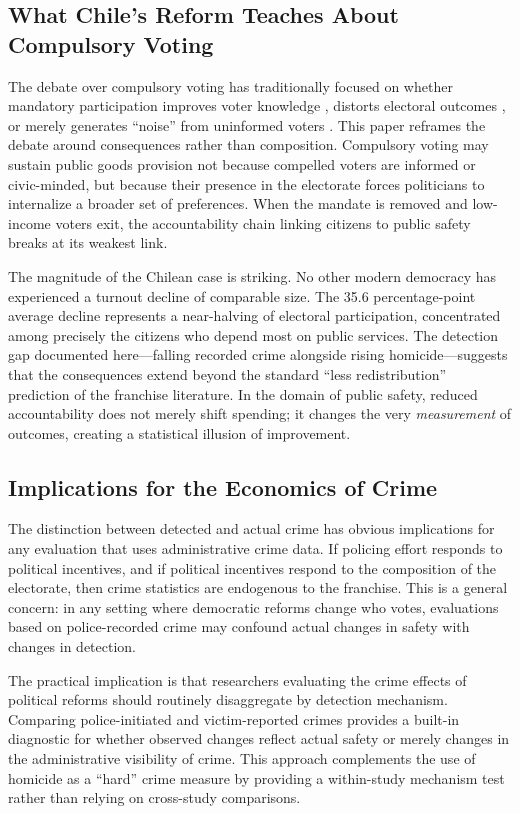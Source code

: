 \documentclass[12pt]{article}
\begin{document}
\subsection{What Chile's Reform Teaches About Compulsory Voting}

The debate over compulsory voting has traditionally focused on whether mandatory participation improves voter knowledge \citep{Bechtel2016}, distorts electoral outcomes \citep{Fowler2013}, or merely generates ``noise'' from uninformed voters \citep{Funk2010}. This paper reframes the debate around consequences rather than composition. Compulsory voting may sustain public goods provision not because compelled voters are informed or civic-minded, but because their presence in the electorate forces politicians to internalize a broader set of preferences. When the mandate is removed and low-income voters exit, the accountability chain linking citizens to public safety breaks at its weakest link.

The magnitude of the Chilean case is striking. No other modern democracy has experienced a turnout decline of comparable size. The 35.6 percentage-point average decline represents a near-halving of electoral participation, concentrated among precisely the citizens who depend most on public services. The detection gap documented here---falling recorded crime alongside rising homicide---suggests that the consequences extend beyond the standard ``less redistribution'' prediction of the franchise literature. In the domain of public safety, reduced accountability does not merely shift spending; it changes the very \textit{measurement} of outcomes, creating a statistical illusion of improvement.

\subsection{Implications for the Economics of Crime}

The distinction between detected and actual crime has obvious implications for any evaluation that uses administrative crime data. If policing effort responds to political incentives, and if political incentives respond to the composition of the electorate, then crime statistics are endogenous to the franchise. This is a general concern: in any setting where democratic reforms change who votes, evaluations based on police-recorded crime may confound actual changes in safety with changes in detection.

The practical implication is that researchers evaluating the crime effects of political reforms should routinely disaggregate by detection mechanism. Comparing police-initiated and victim-reported crimes provides a built-in diagnostic for whether observed changes reflect actual safety or merely changes in the administrative visibility of crime. This approach complements the use of homicide as a ``hard'' crime measure \citep{Dube2013} by providing a within-study mechanism test rather than relying on cross-study comparisons.
\end{document}
